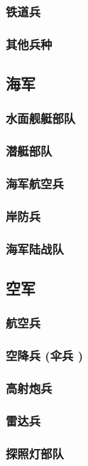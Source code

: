 \documentclass[UTF8]{../ApplicationUniverse}
\begin{document}
        \subsubsection{铁道兵}
        \subsubsection{其他兵种}
    \subsection{海军}
        \subsubsection{水面舰艇部队}
        \subsubsection{潜艇部队}
        \subsubsection{海军航空兵}
        \subsubsection{岸防兵}
        \subsubsection{海军陆战队}
    \subsection{空军}
        \subsubsection{航空兵}
        \subsubsection{空降兵 (伞兵 )}
        \subsubsection{高射炮兵}
        \subsubsection{雷达兵}
        \subsubsection{探照灯部队}
\end{document}
